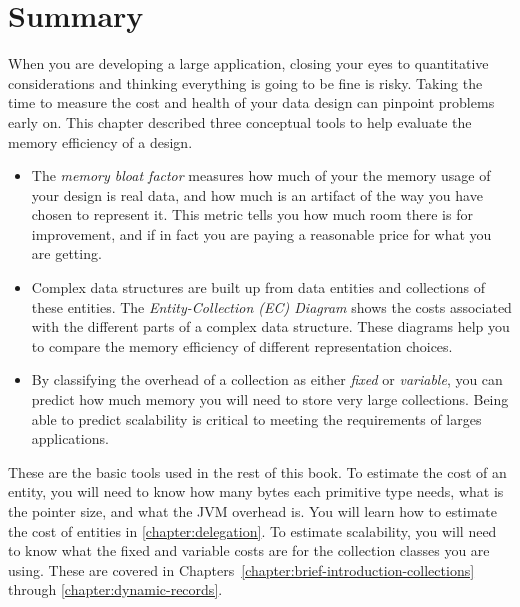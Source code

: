 \section{Summary}

When you are developing a large application, closing your eyes to quantitative
considerations and thinking everything is going to be fine is risky. Taking the
time to measure the cost and health of your data design can pinpoint problems
early on. This chapter described three conceptual tools to help evaluate the
memory efficiency of a design.
\begin{itemize}
\item The \textsl{memory bloat factor} measures how much of your the memory
usage of your design is real data, and how much is an artifact of the way you
have chosen to represent it. This metric tells you how much room there is for
improvement, and if in fact you are paying a reasonable price for what you are
getting.
\item Complex data structures are built up from data entities and collections of
these entities.  The \textsl{Entity-Collection (EC) Diagram} shows the costs
associated with the different parts of a complex data structure. These diagrams
help you to compare the memory efficiency of different representation choices.
\item By classifying the overhead of a collection as either \textsl{fixed} or
\textsl{variable}, you can predict how much memory you will need to store very
large collections. Being able to predict scalability is critical to meeting the
requirements of larges applications.
\end{itemize}
These are the basic tools used in the rest of this book. To estimate the cost of
an entity, you will need to know how many bytes each primitive type needs, what
is the pointer size, and what the JVM overhead is. You will learn how to
estimate the cost of entities in \autoref{chapter:delegation}. To estimate scalability,
you will need to know what the fixed and variable costs are for the collection classes
you are using. These are covered in Chapters~\ref{chapter:brief-introduction-collections}
through \ref{chapter:dynamic-records}.

